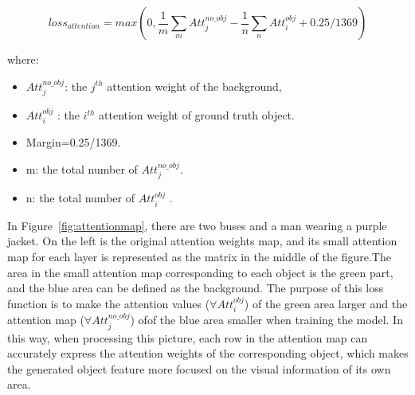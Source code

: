 
\begin{equation}
	loss_{attention}=max(0, \frac{1}{m}\sum_{m}Att_j^{no\_obj}-\frac{1}{n}\sum_{n}Att_i^{obj}+0.25
	/1369)
\end{equation}

where:
\begin{itemize}
	\item $Att_j^{no\_obj}$: the $  j^{th}  $ attention weight  of the background,
	\item $ Att_i^{obj} $ :  the $ i^{th} $ attention weight of ground truth object.
	\item Margin=0.25/1369.
	\item m:  the total number of $Att_j^{no\_obj}$.
	\item n: the total number of $ Att_i^{obj} $ .
\end{itemize}


In Figure~\ref{fig:attentionmap}, there are two buses and a man wearing a purple jacket. On the left is the original attention weights map, and its small attention map for each layer is represented as the matrix in the middle of the figure.The area in the small attention map corresponding to each object is the green part, and the blue area can be defined as the background. The purpose of this loss function is to make the attention values ($ \forall Att_i^{obj} $)  of the green area larger and the attention map ($ \forall Att_j^{no\_obj}$) ofof the blue area smaller when training the model. In this way, when processing this picture, each row in the attention map can accurately express the attention weights of the corresponding object, which makes the generated object feature more focused on the visual information of its own area.

